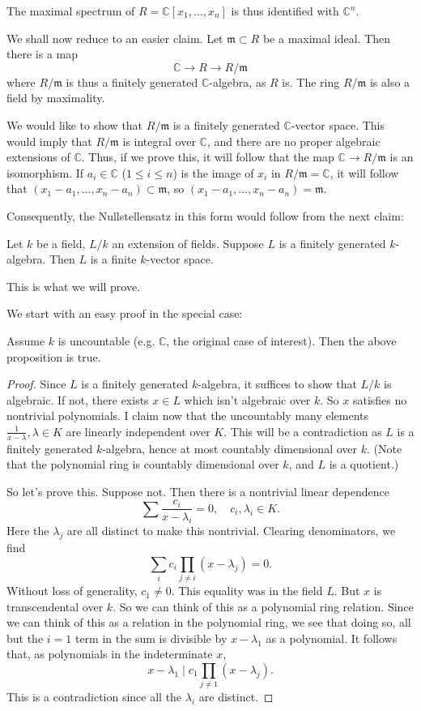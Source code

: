 The maximal spectrum of $R=\mathbb{C}[x_1, \dots, x_n]$ is thus identified with
$\mathbb{C}^n$.

We shall now reduce  to an easier claim.
Let
$\mathfrak{m}\subset R$ be a maximal ideal. Then there is a map
\[ \mathbb{C} \to R \to R/\mathfrak{m}  \]
where $R/\mathfrak{m}$ is thus a finitely generated $\mathbb{C}$-algebra, as
$R$ is.  The ring $R/\mathfrak{m}$ is also a field by maximality.

We would like to show that $R/\mathfrak{m}$ is a finitely generated
$\mathbb{C}$-vector
space. This would imply that $R/\mathfrak{m}$ is integral over $\mathbb{C}$,
and there are no proper algebraic extensions of $\mathbb{C}$. Thus, if we
prove this, it will follow that the map $\mathbb{C} \to R/\mathfrak{m}$ is an
isomorphism. If $a_i \in \mathbb{C}$ ($1 \leq i \leq n$) is the image of
$x_i $ in $R/\mathfrak{m} =
\mathbb{C}$, it will follow that $(x_1 - a_1, \dots, x_n - a_n) \subset
\mathfrak{m}$, so $(x_1 - a_1, \dots, x_n - a_n)=
\mathfrak{m}$.


Consequently, the Nullstellensatz in this form would follow from the next
claim:

\begin{proposition}
Let $k$ be a field, $L/k$ an extension of fields. Suppose $L$ is a finitely
generated $k$-algebra. Then $L$ is a finite $k$-vector space.
\end{proposition}
This is what we will prove.

We start with an easy proof in the special case:
\begin{lemma}
Assume $k$ is uncountable (e.g. $\mathbb{C}$, the original case of interest).
Then the above proposition is true.
\end{lemma}
\begin{proof}
Since $L$ is a finitely generated $k$-algebra, it suffices to show that $L/k$
is algebraic.
If not, there exists $x \in L$ which isn't algebraic over $k$. So $x$ satisfies
no nontrivial polynomials.
I claim now that the uncountably many elements $\frac{1}{x-\lambda}, \lambda
\in K$ are linearly
independent over $K$. This will be a contradiction as $L$ is a finitely
generated $k$-algebra, hence at most countably dimensional over $k$. (Note that
the polynomial ring is countably dimensional over $k$, and $L$ is a quotient.)

So let's prove this. Suppose not. Then there is a nontrivial linear dependence
\[ \sum \frac{c_i}{x - \lambda_i}  = 0, \quad c_i, \lambda_i \in K. \]
Here the $\lambda_j$ are all distinct to make this nontrivial. Clearing
denominators, we find
\[ \sum_i c_i \prod_{j \neq i } (x- \lambda_j) = 0. \]
Without loss of generality, $c_1 \neq 0$.
This equality was in the field $L$. But $x$ is transcendental over $k$. So we
can think of this as a polynomial ring relation.
Since we can think of this as a relation in the polynomial ring, we see that
doing so, all but the $i =1$ term in the sum is divisible by $x - \lambda_1$
as a polynomial.
It follows that, as polynomials in the indeterminate $x$,
\[ x - \lambda_1 \mid c_1 \prod_{j \neq 1} (x - \lambda_j).  \]
This is a contradiction since all the $\lambda_i$ are distinct.
\end{proof}

